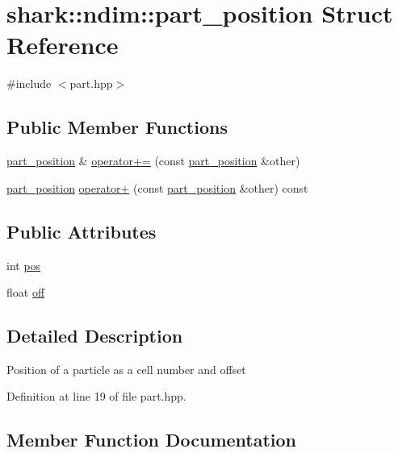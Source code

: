 \hypertarget{structshark_1_1ndim_1_1part__position}{}\section{shark\+:\+:ndim\+:\+:part\+\_\+position Struct Reference}
\label{structshark_1_1ndim_1_1part__position}


{\ttfamily \#include $<$part.\+hpp$>$}

\subsection*{Public Member Functions}
\begin{DoxyCompactItemize}
\item 
\hyperlink{structshark_1_1ndim_1_1part__position}{part\+\_\+position} \& \hyperlink{structshark_1_1ndim_1_1part__position_a98032711a8d472c30613f93e70b0b269}{operator+=} (const \hyperlink{structshark_1_1ndim_1_1part__position}{part\+\_\+position} \&other)
\item 
\hyperlink{structshark_1_1ndim_1_1part__position}{part\+\_\+position} \hyperlink{structshark_1_1ndim_1_1part__position_abb78115485d38413c07a41104542d8b7}{operator+} (const \hyperlink{structshark_1_1ndim_1_1part__position}{part\+\_\+position} \&other) const
\end{DoxyCompactItemize}
\subsection*{Public Attributes}
\begin{DoxyCompactItemize}
\item 
int \hyperlink{structshark_1_1ndim_1_1part__position_abbc439e94001c9f96cc8985d683e24e0}{pos}
\item 
float \hyperlink{structshark_1_1ndim_1_1part__position_a914e3d4214109e716fcfd06a46e07810}{off}
\end{DoxyCompactItemize}


\subsection{Detailed Description}
Position of a particle as a cell number and offset 

Definition at line 19 of file part.\+hpp.



\subsection{Member Function Documentation}
\hypertarget{structshark_1_1ndim_1_1part__position_abb78115485d38413c07a41104542d8b7}{}\label{structshark_1_1ndim_1_1part__position_abb78115485d38413c07a41104542d8b7} 
